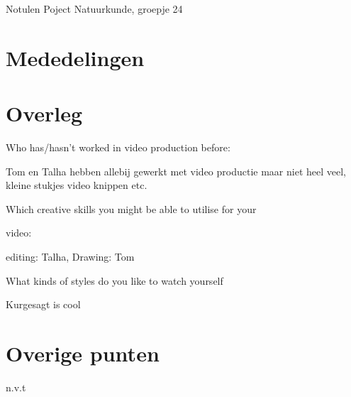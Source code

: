 \documentclass[11pt,a4paper]{article}
\begin{document}
\begin{Minutes}{Notulen Poject Natuurkunde, groepje 24}


\endtime{}
\location{}




\maketitle



\newpage


\section{Mededelingen} 


\section{Overleg}
Who has/hasn't worked in video production before:

Tom en Talha hebben allebij gewerkt met video productie maar niet heel veel, kleine stukjes video knippen etc.


Which creative skills you might be able to utilise for your 

video:

editing: Talha, Drawing: Tom

What kinds of styles do you like to watch yourself


Kurgesagt is cool

\section{Overige punten}
n.v.t

\end{Minutes}
\end{document}
